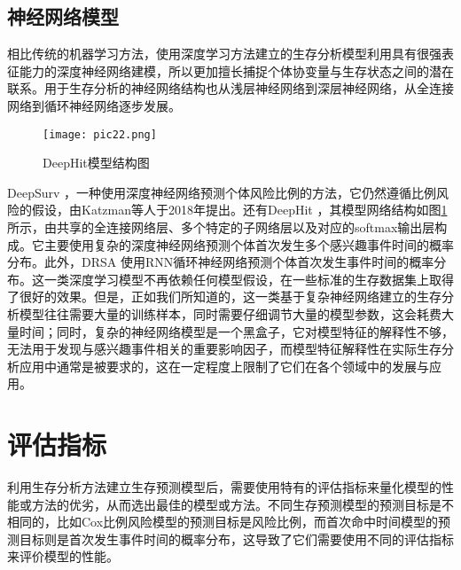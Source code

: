 \subsection{神经网络模型}

相比传统的机器学习方法，使用深度学习方法建立的生存分析模型利用具有很强表征能力的深度神经网络建模，所以更加擅长捕捉个体协变量与生存状态之间的潜在联系。用于生存分析的神经网络结构也从浅层神经网络到深层神经网络，从全连接网络到循环神经网络逐步发展。

\begin{figure}[H]
\texttt{[image: pic22.png]}
\caption{DeepHit模型结构图}
\label{pic22}
\end{figure}

DeepSurv ，一种使用深度神经网络预测个体风险比例的方法，它仍然遵循比例风险的假设，由Katzman等人于2018年提出。还有DeepHit ，其模型网络结构如图\ref{pic22}所示，由共享的全连接网络层、多个特定的子网络层以及对应的softmax输出层构成。它主要使用复杂的深度神经网络预测个体首次发生多个感兴趣事件时间的概率分布。此外，DRSA 使用RNN循环神经网络预测个体首次发生事件时间的概率分布。这一类深度学习模型不再依赖任何模型假设，在一些标准的生存数据集上取得了很好的效果。但是，正如我们所知道的，这一类基于复杂神经网络建立的生存分析模型往往需要大量的训练样本，同时需要仔细调节大量的模型参数，这会耗费大量时间；同时，复杂的神经网络模型是一个黑盒子，它对模型特征的解释性不够，无法用于发现与感兴趣事件相关的重要影响因子，而模型特征解释性在实际生存分析应用中通常是被要求的，这在一定程度上限制了它们在各个领域中的发展与应用。

\section{评估指标}

利用生存分析方法建立生存预测模型后，需要使用特有的评估指标来量化模型的性能或方法的优劣，从而选出最佳的模型或方法。不同生存预测模型的预测目标是不相同的，比如Cox比例风险模型的预测目标是风险比例，而首次命中时间模型的预测目标则是首次发生事件时间的概率分布，这导致了它们需要使用不同的评估指标来评价模型的性能。

